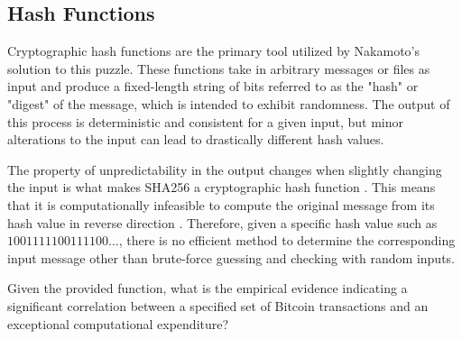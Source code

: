 \subsection{Hash Functions}
Cryptographic hash functions are the primary tool utilized by Nakamoto's solution to this puzzle. These functions take in arbitrary messages or
files as input and produce a fixed-length string of bits referred to as the "hash" or "digest" of the message, which is intended to exhibit
randomness. The output of this process is deterministic and consistent for a given input, but minor alterations to the input can lead to
drastically different hash values.

The property of unpredictability in the output changes when slightly changing the input is what makes SHA256 a cryptographic hash function
\cite{dang2015secure}. This means that it is computationally infeasible to compute the original message from its hash value in reverse
direction \cite{butin2017hash}. Therefore, given a specific hash value such as $1001111100111100\ldots$, there is no
efficient method to determine the corresponding input message other than brute-force guessing and checking with random inputs.

Given the provided function, what is the empirical evidence indicating a significant correlation between a specified set of Bitcoin
transactions and an exceptional computational expenditure?
